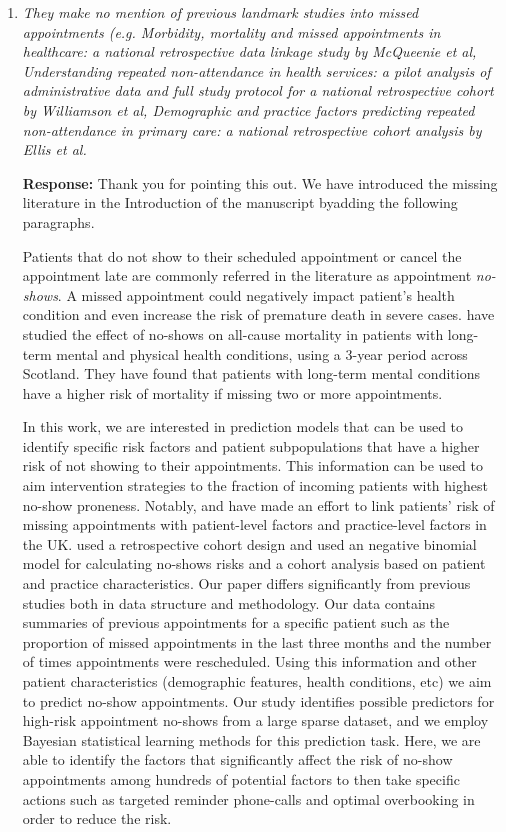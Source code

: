 \documentclass[11pt,a4paper,oneside]{article}
\begin{document}
\begin{enumerate}
\item {\em They make no mention of previous landmark studies into missed appointments (e.g. Morbidity, mortality and missed appointments in healthcare: a national retrospective data linkage study by McQueenie et al, 
Understanding repeated non-attendance in health services: a pilot analysis of administrative data and full study protocol for a national retrospective cohort by Williamson et al, Demographic and practice factors predicting repeated non-attendance in primary care: a national retrospective cohort analysis by Ellis et al.}

\vspace{12pt}

{\bf Response:}  Thank you for pointing this out.  We have introduced the missing literature in the Introduction of the manuscript byadding the following paragraphs.

Patients that do not show to their scheduled appointment or cancel the appointment late are commonly referred in the literature as appointment \emph{no-shows}. A missed appointment could negatively impact patient's health condition and even increase the risk of premature death in severe cases. \cite{McQueenie19} have studied the effect of no-shows on all-cause mortality in patients with long-term mental and physical health conditions, using a 3-year period across Scotland. They have found that patients with long-term mental conditions have a higher risk of mortality if missing two or more appointments. 

 In this work, we are interested in prediction models that can be used to identify specific risk factors and patient subpopulations that have a higher risk of not showing to their appointments. This information can be used to aim intervention strategies to the fraction of incoming patients with highest no-show proneness. Notably, \cite{Williamson17} and \cite{Ellis17} have made an effort to link patients' risk of missing appointments with patient-level factors and practice-level factors in the UK.  \cite{Williamson17} used a retrospective cohort design and \cite{Ellis17} used an negative binomial model for calculating no-shows risks and a cohort analysis based on patient and practice characteristics. Our paper differs significantly from previous studies both in data structure and methodology. Our data contains summaries of previous appointments for a specific patient such as the proportion of missed appointments in the last three months and the number of times appointments were rescheduled. Using this information and other patient characteristics (demographic features, health conditions, etc) we aim to predict no-show appointments. Our study identifies possible predictors for high-risk appointment no-shows from a large sparse dataset, and we employ Bayesian statistical learning methods for this prediction task.  Here, we are able to identify the factors that significantly affect the risk of no-show appointments among hundreds of potential factors to then take specific actions such as targeted reminder phone-calls and optimal overbooking in order to reduce the risk.



\end{enumerate}
\end{document}
